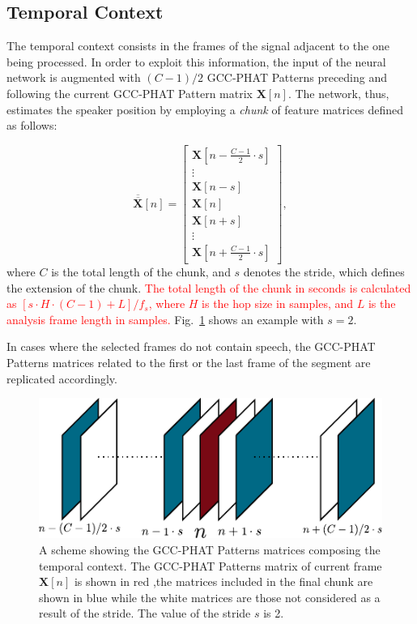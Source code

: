 \documentclass[review]{elsarticle}
\newcommand{\figref}[1]{Fig.~\ref{#1}}
\begin{document}
\subsection{Temporal Context}\label{sec:TEE}
The temporal context consists in the frames of the signal adjacent to the one being processed. In order to exploit this information, the input of the neural network  is augmented with $(C-1)/2$ GCC-PHAT Patterns preceding and following the current GCC-PHAT Pattern matrix $\mathbf{X}[n]$. The network, thus, estimates the speaker position by employing a \textit{chunk} of feature matrices defined as follows:

\begin{equation}
\overline{\overline{\mathbf{X}}}[n]= \left [ \begin{array}{c} 
\mathbf{X}[n -  \frac{C-1}{2} \cdot s]\\
\vdots\\
\mathbf{X}[n - s]\\
\mathbf{X}[n]\\
\mathbf{X}[n+s]\\
\vdots\\
\mathbf{X}[n + \frac{C-1}{2} \cdot s]
\end{array}
\right ],
\end{equation}
where $C$ is the total length of the chunk, and $s$ denotes the stride, which defines the extension of the chunk.  \textcolor{red}{The total length of the chunk in seconds is calculated as $\left [s\cdot H \cdot(C-1)+L \right ]/f_s$, where $H$ is the hop size in samples, and $L$ is the analysis frame length in samples.} \figref{fig:cxt_str} shows an example with $s=2$.

In cases where the selected frames do not contain speech, the GCC-PHAT Patterns matrices related to the first or the last frame of the segment are replicated accordingly.

\begin{figure}[h] 
	\centering
	\includegraphics[width=0.65\columnwidth]{imgs/cxt_str}
	\caption{A scheme showing the GCC-PHAT Patterns matrices composing the temporal context. The GCC-PHAT Patterns matrix of current frame $\mathbf{X}[n]$ is shown in red ,the matrices included in the final chunk are shown in blue while the white matrices are those not considered as a result of the stride. The value of the stride $s$ is 2.}
	\label{fig:cxt_str}
\end{figure} 
\end{document}
